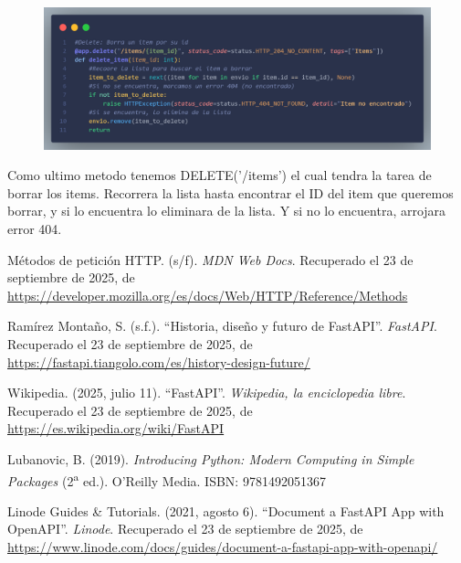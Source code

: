\documentclass[12pt]{article}
\begin{document}
\begin{figure}[H]
    \centering
    \includegraphics[width=1\textwidth]{Imagenes/Captura10_patch.png}    
\end{figure}
Como ultimo metodo tenemos DELETE('/items') el cual tendra la tarea de borrar los items.
Recorrera la lista hasta encontrar el ID del item que queremos borrar, y si lo encuentra lo eliminara de la lista.
Y si no lo encuentra, arrojara error 404.

\begin{thebibliography}{99}

 M\'etodos de petici\'on HTTP. (s/f). \textit{MDN Web Docs}. Recuperado el 23 de septiembre de 2025, de \url{https://developer.mozilla.org/es/docs/Web/HTTP/Reference/Methods}

 Ram\'irez Monta\~no, S. (s.f.). ``Historia, dise\~no y futuro de FastAPI''. \textit{FastAPI}. Recuperado el 23 de septiembre de 2025, de \url{https://fastapi.tiangolo.com/es/history-design-future/}

 Wikipedia. (2025, julio 11). ``FastAPI''. \textit{Wikipedia, la enciclopedia libre}. Recuperado el 23 de septiembre de 2025, de \url{https://es.wikipedia.org/wiki/FastAPI}

 Lubanovic, B. (2019). \textit{Introducing Python: Modern Computing in Simple Packages} (2\textsuperscript{a} ed.). O'Reilly Media. ISBN: 9781492051367

 Linode Guides \& Tutorials. (2021, agosto 6). ``Document a FastAPI App with OpenAPI''. \textit{Linode}. Recuperado el 23 de septiembre de 2025, de \url{https://www.linode.com/docs/guides/document-a-fastapi-app-with-openapi/}

\end{thebibliography}
\end{document}

